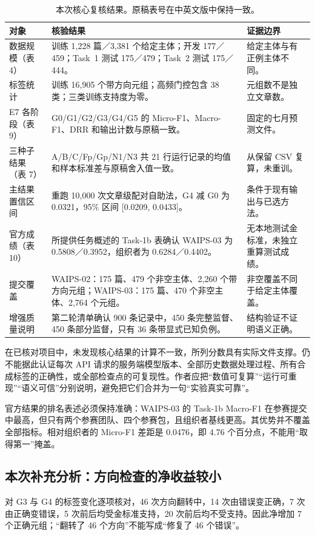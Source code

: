 \documentclass[12pt,a4paper]{article}
\begin{document}
\begin{table}[htbp]
\centering\small
\caption{本次核心复核结果。原稿表号在中英文版中保持一致。}
\begin{tabularx}{\textwidth}{@{}P{3cm}YP{3.3cm}@{}}
\toprule
对象 & 核验结果 & 证据边界 \\
\midrule
数据规模（表 4） & 训练 1,228 篇／3,381 个给定主体；开发 177／459；Task~1 测试 175／479；Task~2 测试 175／444。 & 给定主体与有正例主体不同。 \\
标签统计 & 训练 16,905 个带方向元组；高频门控包含 38 类；三类训练支持度为零。 & 元组数不是独立文章数。 \\
E7 各阶段（表 9） & G0/G1/G2/G3/G4/G5 的 Micro-F1、Macro-F1、DRR 和输出计数与原稿一致。 & 固定的七月预测文件。 \\
三种子结果（表 7） & A/B/C/Fp/Gp/N1/N3 共 21 行运行记录的均值和样本标准差与原稿舍入值一致。 & 从保留 CSV 复算，未重训。 \\
主结果置信区间 & 重跑 10,000 次文章级配对自助法，G4 减 G0 为 0.0321，95\% 区间 [0.0209, 0.0433]。 & 条件于现有输出与已选方法。 \\
官方成绩（表 10） & 所提供任务概述的 Task-1b 表确认 WAIPS-03 为 0.5808／0.3952，组织者为 0.6284／0.4402。 & 无本地测试金标准，未独立重算测试成绩。 \\
提交覆盖 & WAIPS-02：175 篇、479 个非空主体、2,260 个带方向元组；WAIPS-03：175 篇、470 个非空主体、2,764 个元组。 & 非空覆盖不同于给定主体覆盖。 \\
增强质量说明 & 第二轮清单确认 900 条记录中，450 条完整监督、450 条部分监督，只有 36 条带显式已知负例。 & 结构验证不证明语义正确。 \\
\bottomrule
\end{tabularx}
\end{table}

在已核对项目中，未发现核心结果的计算不一致，所列分数具有实际文件支撑。仍不能据此认证每次 API 请求的服务端模型版本、全部历史数据处理过程、所有合成标签的正确性，或全部检查点的可复现性。作者应把“数值可复算”“运行可重现”“语义可信”分别说明，避免把它们合并为一句“实验真实可靠”。

官方结果的排名表述必须保持准确：WAIPS-03 的 Task-1b Macro-F1 在参赛提交中最高，但只有两个参赛团队、四个参赛包，且组织者基线更高。其优势并不覆盖全部指标。相对组织者的 Micro-F1 差距是 0.0476，即 4.76 个百分点，不能用“取得第一”掩盖。

\subsection{本次补充分析：方向检查的净收益较小}
对 G3 与 G4 的标签变化逐项核对，46 次方向翻转中，14 次由错误变正确，7 次由正确变错误，5 次前后均受金标准支持，20 次前后均不受支持。因此净增加 7 个正确元组；“翻转了 46 个方向”不能写成“修复了 46 个错误”。
\end{document}
